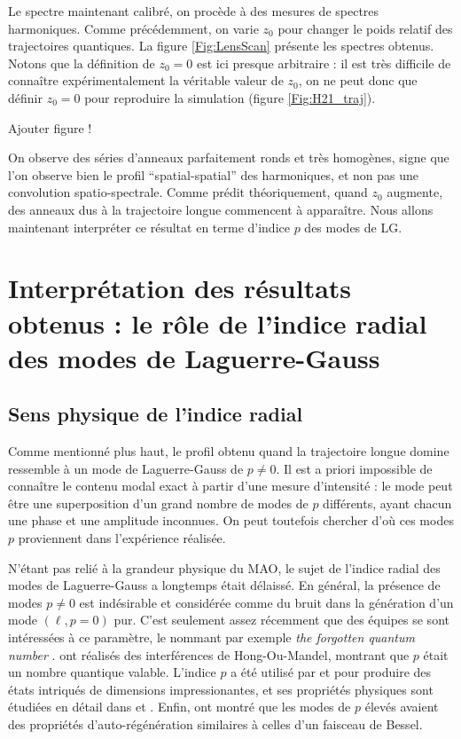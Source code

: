 Le spectre maintenant calibré, on procède à des mesures de spectres harmoniques. Comme précédemment, on varie $z_0$ pour changer le poids relatif des trajectoires quantiques. La figure \ref{Fig:LensScan} présente les spectres obtenus. Notons que la définition de $z_0=0$ est ici presque arbitraire : il est très difficile de connaître expérimentalement la véritable valeur de $z_0$, on ne peut donc que définir $z_0=0$ pour reproduire la simulation (figure \ref{Fig:H21_traj}).

\textcolor[rgb]{1,0,0}{Ajouter figure !}

On observe des séries d'anneaux parfaitement ronds et très homogènes, signe que l'on observe bien le profil ``spatial-spatial'' des harmoniques, et non pas une convolution spatio-spectrale. Comme prédit théoriquement, quand $z_0$ augmente, des anneaux dus à la trajectoire longue commencent à apparaître. Nous allons maintenant interpréter ce résultat en terme d'indice $p$ des modes de LG.

\section{Interprétation des résultats obtenus : le rôle de l'indice radial des modes de Laguerre-Gauss}
\subsection{Sens physique de l'indice radial}
Comme mentionné plus haut, le profil obtenu quand la trajectoire longue domine ressemble à un mode de Laguerre-Gauss de $p\neq 0$. Il est a priori impossible de connaître le contenu modal exact à partir d'une mesure d'intensité : le mode peut être une superposition d'un grand nombre de modes de $p$ différents, ayant chacun une phase et une amplitude inconnues. On peut toutefois chercher d'où ces modes $p$ proviennent dans l'expérience réalisée.

N'étant pas relié à la grandeur physique du MAO, le sujet de l'indice radial des modes de Laguerre-Gauss a longtemps était délaissé. En général, la présence de modes $p\neq 0$ est indésirable et considérée comme du bruit dans la génération d'un mode $(\ell,p=0)$ pur. C'est seulement assez récemment que des équipes se sont intéressées à ce paramètre, le nommant par exemple \textit{the forgotten quantum number} .  ont réalisés des interférences de Hong-Ou-Mandel, montrant que $p$ était un nombre quantique valable. L'indice $p$ a été utilisé par  et  pour produire des états intriqués de dimensions impressionantes, et ses propriétés physiques sont étudiées en détail dans  et 	. Enfin,  ont montré que les modes de $p$ élevés avaient des propriétés d'auto-régénération similaires à celles d'un faisceau de Bessel. 

